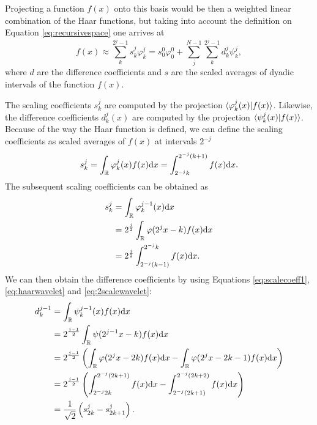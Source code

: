 \documentclass[../Thesis.tex]{subfiles}
\begin{document}
Projecting a function $f(x)$ onto this basis would be then a weighted linear combination
of the Haar functions, but taking into account the definition on Equation \ref{eq:recursivespace} one arrives
at \cite{Sorland}
\begin{equation}\label{eq:projectftohaar}
  f(x)\approx \sum^{2^j -1}_k s^j_k\varphi^j_k = s^0_0\varphi^0_0 + \sum^{N - 1}_j\sum^{2^j -1}_k d^j_k\psi^j_k,
\end{equation}
where $d$ are the difference coefficients and $s$ are the scaled averages of dyadic intervals of the function $f(x)$.

The scaling coefficients $s^j_k$ are computed by the projection $\braket{\varphi^j_k(x)|f(x)}$.
Likewise, the difference coefficients $d^j_k(x)$ are computed by the projection \newline$\braket{\psi^j_k(x)|f(x)}$.
Because of the way the Haar function is defined, we can define  the scaling coefficients as
scaled averages of $f(x)$ at intervals $2^{-j}$ \cite{Sorland, Beylkin:MRA}
\begin{equation}
  s^j_k = \int_{\mathbb{R}}\varphi^j_k(x)f(x)\text{d}x = \int^{2^{-j}(k + 1)}_{2^{-j}k} f(x) \text{d}x\label{eq:scalecoeff1}.
\end{equation}
The subsequent scaling coefficients can be obtained as
\begin{align}
  \begin{split}\label{eq:scalecoeffint}
    s^{j}_k &= \int_{\mathbb{R}}\varphi^{j-1}_k(x)\text{d}x\\
            &= 2^{\frac{j}{2}}\int_{\mathbb{R}}\varphi(2^{j}x - k)f(x)\text{d}x\\
            &= 2^{\frac{j}{2}}\int_{2^{-j}(k-1)}^{2^{-j}k}f(x)\text{d}x.\\
  \end{split}
\end{align}
We can then obtain the difference coefficients by using Equations \ref{eq:scalecoeff1}, \ref{eq:haarwavelet} and \ref{eq:2scalewavelet}:
\begin{align}
  \begin{split}\label{eq:diffcoeffint}
    d^{j - 1}_k &= \int_{\mathbb{R}}\psi^{j-1}_k(x)f(x)\text{d}x\\
                &= 2^{\frac{j - 1}{2}}\int_{\mathbb{R}}\psi(2^{j-1}x - k)f(x)\text{d}x\\
                &= 2^{\frac{j - 1}{2}}\left(\int_{\mathbb{R}}\varphi(2^jx - 2k)f(x)\text{d}x  - \int_{\mathbb{R}}\varphi(2^jx - 2k - 1)f(x)\text{d}x\right)\\
                &= 2^{\frac{j - 1}{2}}\left( \int^{2^{-j}(2k+1)}_{2^{-j}2k}f(x)\text{d}x - \int^{2^{-j}(2k+2)}_{2^{-j}(2k + 1)}f(x)\text{d}x \right)\\
                &= \frac{1}{\sqrt{2}}\left(s^{j}_{2k} - s^{j}_{2k+1} \right).
  \end{split}
\end{align}
\end{document}
